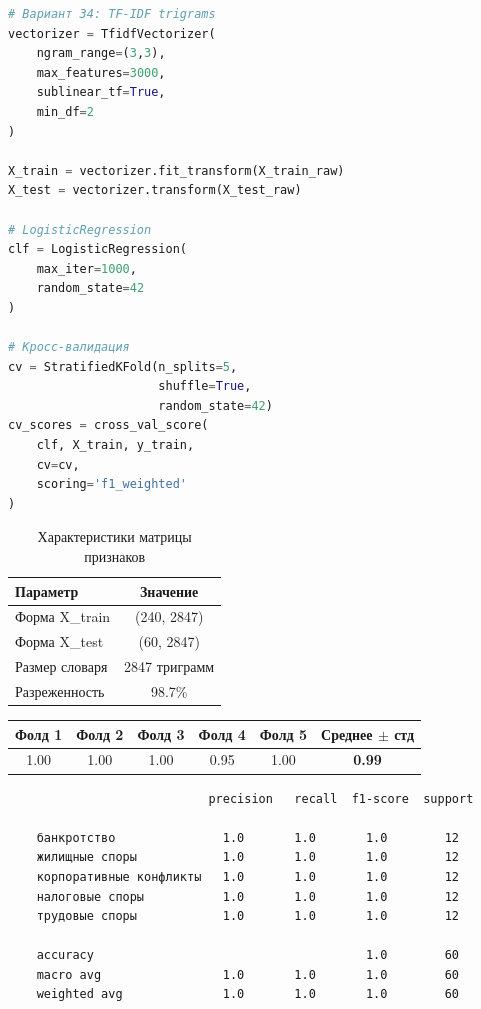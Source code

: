 \documentclass[a4paper,12pt]{article}
\begin{document}
\begin{infobox}
\begin{lstlisting}[language=Python]
# Вариант 34: TF-IDF trigrams
vectorizer = TfidfVectorizer(
    ngram_range=(3,3), 
    max_features=3000,
    sublinear_tf=True, 
    min_df=2
)

X_train = vectorizer.fit_transform(X_train_raw)
X_test = vectorizer.transform(X_test_raw)

# LogisticRegression
clf = LogisticRegression(
    max_iter=1000, 
    random_state=42
)

# Кросс-валидация
cv = StratifiedKFold(n_splits=5, 
                     shuffle=True, 
                     random_state=42)
cv_scores = cross_val_score(
    clf, X_train, y_train, 
    cv=cv, 
    scoring='f1_weighted'
)
\end{lstlisting}
\end{infobox}

\begin{table}[H]
\centering
\caption{Характеристики матрицы признаков}
\begin{tabular}{|l|c|}
\hline
\textbf{Параметр} & \textbf{Значение} \\ \hline
Форма X\_train & (240, 2847) \\ \hline
Форма X\_test & (60, 2847) \\ \hline
Размер словаря & 2847 триграмм \\ \hline
Разреженность & 98.7\% \\ \hline
\end{tabular}
\end{table}

\begin{infobox}
\begin{tabular}{|c|c|c|c|c|c|}
\hline
\textbf{Фолд 1} & \textbf{Фолд 2} & \textbf{Фолд 3} & \textbf{Фолд 4} & \textbf{Фолд 5} & \textbf{Среднее $\pm$ стд} \\ \hline
1.00 & 1.00 & 1.00 & 0.95 & 1.00& \textbf{0.99} \\ \hline
\end{tabular}
\end{infobox}

\begin{infobox}
\begin{verbatim}
                            precision   recall  f1-score  support

    банкротство               1.0       1.0       1.0        12
    жилищные споры            1.0       1.0       1.0        12
    корпоративные конфликты   1.0       1.0       1.0        12
    налоговые споры           1.0       1.0       1.0        12
    трудовые споры            1.0       1.0       1.0        12

    accuracy                                      1.0        60
    macro avg                 1.0       1.0       1.0        60
    weighted avg              1.0       1.0       1.0        60
\end{verbatim}
\end{infobox}
\end{document}
